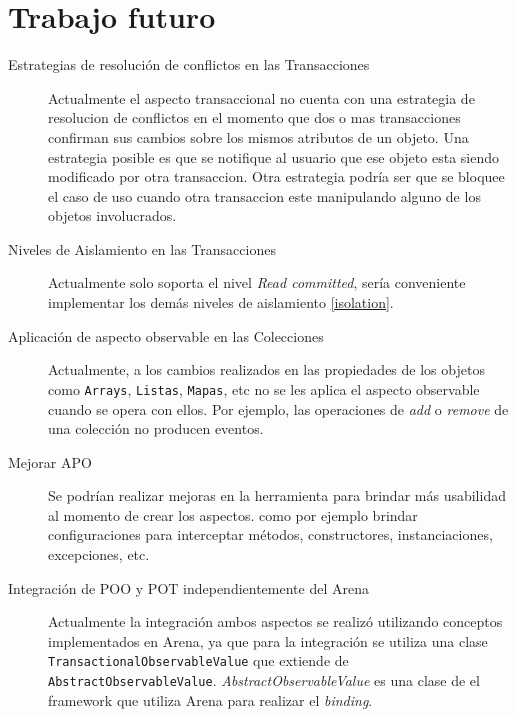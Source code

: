 
\section{Trabajo futuro}
\label{futurework}

\begin{description}

	\item[Estrategias de resolución de conflictos en las Transacciones]
		Actualmente el aspecto transaccional no cuenta con una estrategia de
		resolucion de conflictos en	 el momento que dos o mas transacciones
		confirman sus cambios sobre los mismos atributos de un objeto.
		Una estrategia posible es que se notifique al usuario que ese
		objeto esta siendo modificado por otra transaccion.
		Otra estrategia podría ser que se bloquee el caso de uso cuando otra
		transaccion este manipulando alguno de los objetos involucrados.

	\item[Niveles de Aislamiento en las Transacciones]
		Actualmente solo soporta el nivel \emph{Read committed}, sería conveniente
		implementar los demás niveles de aislamiento \ref{isolation}.
	
	\item[Aplicación de aspecto observable en las Colecciones]
		Actualmente, a los cambios realizados en las propiedades de los objetos
		como \lstinline|Arrays|, \lstinline|Listas|, \lstinline|Mapas|, etc no se les
		aplica el aspecto observable cuando se opera con ellos. Por ejemplo, las
		operaciones de \emph{add} o \emph{remove} de una colección no producen
		eventos.
		
	\item[Mejorar APO]
		Se podrían realizar mejoras en la herramienta para brindar más usabilidad al
		momento de crear los aspectos. como por ejemplo brindar configuraciones para
		interceptar métodos, constructores, instanciaciones, excepciones, etc.
		
	\item[Integración de POO y POT independientemente del Arena]
		Actualmente la integración ambos aspectos se realizó utilizando conceptos
		implementados en Arena, ya que para la integración se utiliza una clase
		\lstinline|TransactionalObservableValue| que extiende de
		\lstinline|AbstractObservableValue|. \emph{AbstractObservableValue} es una
		clase de el framework que utiliza Arena para realizar el \emph{binding}.

\end{description}
